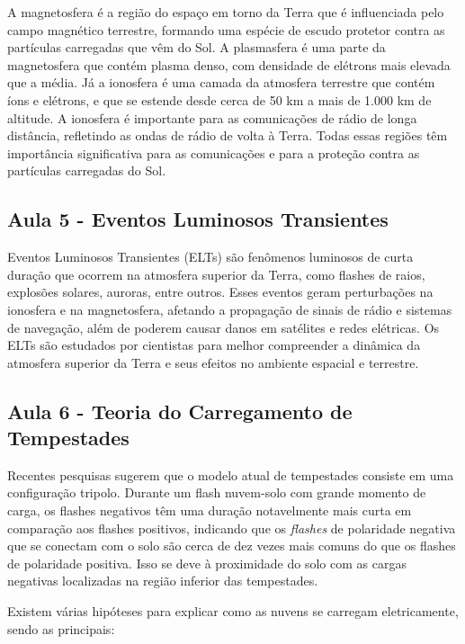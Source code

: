 \documentclass[a4paper, 12pt, onecolumn,singlespacing]{article}
\begin{document}
	A magnetosfera é a região do espaço em torno da Terra que é influenciada pelo campo magnético terrestre, formando uma espécie de escudo protetor contra as partículas carregadas que vêm do Sol. A plasmasfera é uma parte da magnetosfera que contém plasma denso, com densidade de elétrons mais elevada que a média. Já a ionosfera é uma camada da atmosfera terrestre que contém íons e elétrons, e que se estende desde cerca de 50 km a mais de 1.000 km de altitude. A ionosfera é importante para as comunicações de rádio de longa distância, refletindo as ondas de rádio de volta à Terra. Todas essas regiões têm importância significativa para as comunicações e para a proteção contra as partículas carregadas do Sol.
	
	\subsection{Aula 5 - Eventos Luminosos Transientes}
	
	Eventos Luminosos Transientes (ELTs) são fenômenos luminosos de curta duração que ocorrem na atmosfera superior da Terra, como flashes de raios, explosões solares, auroras, entre outros. Esses eventos geram perturbações na ionosfera e na magnetosfera, afetando a propagação de sinais de rádio e sistemas de navegação, além de poderem causar danos em satélites e redes elétricas. Os ELTs são estudados por cientistas para melhor compreender a dinâmica da atmosfera superior da Terra e seus efeitos no ambiente espacial e terrestre.
	
	\subsection{Aula 6 - Teoria do Carregamento de Tempestades}
	
	Recentes pesquisas sugerem que o modelo atual de tempestades consiste em uma configuração tripolo. Durante um flash nuvem-solo com grande momento de carga, os flashes negativos têm uma duração notavelmente mais curta em comparação aos flashes positivos, indicando que os \textit{flashes} de polaridade negativa que se conectam com o solo são cerca de dez vezes mais comuns do que os flashes de polaridade positiva. Isso se deve à proximidade do solo com as cargas negativas localizadas na região inferior das tempestades.
	
	Existem várias hipóteses para explicar como as nuvens se carregam eletricamente, sendo as principais:
	
\end{document}
